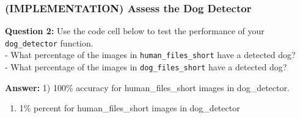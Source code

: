 \documentclass[11pt]{article}
\providecommand{\tightlist}{%
      \setlength{\itemsep}{0pt}\setlength{\parskip}{0pt}}
\begin{document}
    \hypertarget{implementation-assess-the-dog-detector}{%
\subsubsection{(IMPLEMENTATION) Assess the Dog
Detector}\label{implementation-assess-the-dog-detector}}

\textbf{Question 2:} Use the code cell below to test the performance of
your \texttt{dog\_detector} function.\\
- What percentage of the images in \texttt{human\_files\_short} have a
detected dog?\\
- What percentage of the images in \texttt{dog\_files\_short} have a
detected dog?

    \textbf{Answer:} 1) 100\% accuracy for human\_files\_short images in
dog\_detector.

\begin{enumerate}
\def\labelenumi{\arabic{enumi})}
\setcounter{enumi}{1}
\tightlist
\item
  1\% percent for human\_files\_short images in dog\_detector
\end{enumerate}
\end{document}
